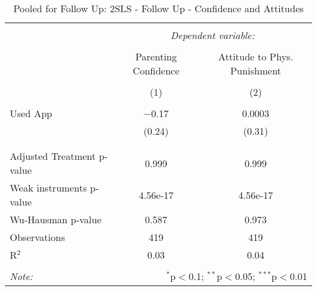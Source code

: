 
\begin{table}[!htbp] \centering 
  \caption{Pooled for Follow Up: 2SLS - Follow Up - Confidence and Attitudes} 
  \label{tbl:Pooled for Follow Up: 2SLS - Follow Up - Confidence and Attitudes} 
\begin{tabular}{@{\extracolsep{5pt}}lcc} 
\\[-1.8ex]\hline 
\hline \\[-1.8ex] 
 & \multicolumn{2}{c}{\textit{Dependent variable:}} \\ 
\cline{2-3} 
\\[-1.8ex] & Parenting Confidence & Attitude to Phys. Punishment \\ 
\\[-1.8ex] & (1) & (2)\\ 
\hline \\[-1.8ex] 
 Used App & $-$0.17 & 0.0003 \\ 
  & (0.24) & (0.31) \\ 
  & & \\ 
\hline \\[-1.8ex] 
Adjusted Treatment p-value & 0.999 & 0.999 \\ 
Weak instruments p-value & 4.56e-17 & 4.56e-17 \\ 
Wu-Hausman p-value & 0.587 & 0.973 \\ 
Observations & 419 & 419 \\ 
R$^{2}$ & 0.03 & 0.04 \\ 
\hline 
\hline \\[-1.8ex] 
\textit{Note:}  & \multicolumn{2}{r}{$^{*}$p$<$0.1; $^{**}$p$<$0.05; $^{***}$p$<$0.01} \\ 
\end{tabular} 
\end{table} 
